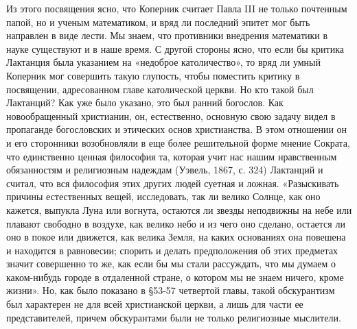 Из этого посвящения ясно, что Коперник считает Павла III не только
почтенным папой, но и ученым математиком, и вряд ли последний эпитет
мог быть направлен в виде лести. Мы знаем, что противники внедрения
математики в науке существуют и в наше время. С другой стороны ясно,
что если бы критика Лактанция была указанием на «недоброе
католичество», то вряд ли умный Коперник мог совершить такую глупость,
чтобы поместить критику в посвящении, адресованном главе католической
церкви. Но кто такой был Лактанций? Как уже было указано, это был
ранний богослов. Как новообращенный христианин, он, естественно,
основную свою задачу видел в пропаганде богословских и этических основ
христианства. В этом отношении он и его сторонники возобновляли в еще
более решительной форме мнение Сократа, что единственно ценная
философия та, которая учит нас нашим нравственным обязанностям и
религиозным надеждам (Уэвель, 1867, с. 324) Лактанций и считал, что
вся философия этих других людей суетная и ложная. «Разыскивать причины
естественных вещей, исследовать, так ли велико Солнце, как оно
кажется, выпукла Луна или вогнута, остаются ли звезды неподвижны на
небе или плавают свободно в воздухе, как велико небо и из чего оно
сделано, остается ли оно в покое или движется, как велика Земля, на
каких основаниях она повешена и находится в равновесии; спорить и
делать предположения об этих предметах значит совершенно то же, как
если бы мы стали рассуждать, что мы думаем о каком-нибудь городе в
отдаленной стране, о котором мы не знаем ничего, кроме жизни». Но, как
было показано в §53-57 четвертой главы, такой обскурантизм был
характерен не для всей христианской церкви, а лишь для части ее
представителей, причем обскурантами были не только религиозные
мыслители.


